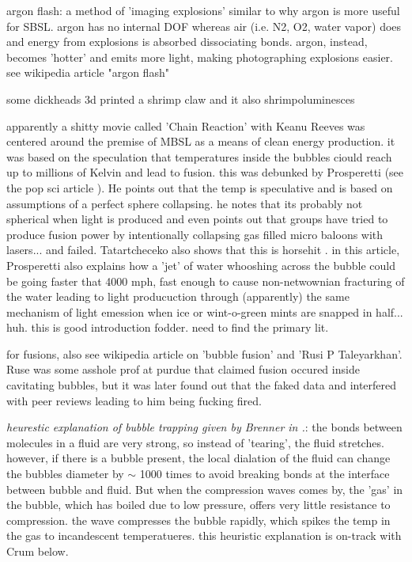 \documentclass[rmp,aps,nofootinbib,superscriptaddress,floatfix]{revtex4-2}
\begin{document}
argon flash: a method of 'imaging explosions' similar to why argon is more useful for SBSL. argon has no internal DOF whereas air (i.e. N2, O2, water vapor) does and energy from explosions is absorbed dissociating bonds. argon, instead, becomes 'hotter' and emits more light, making photographing explosions easier. see wikipedia article "argon flash"



some dickheads 3d printed a shrimp claw and it also shrimpoluminesces \cite{tang2019bioinspired}

apparently a shitty movie called 'Chain Reaction' with Keanu Reeves was centered around the premise of MBSL as a means of clean energy production. it was based on the speculation that temperatures inside the bubbles ciould reach up to millions of Kelvin and lead to fusion. this was debunked by Prosperetti (see the pop sci article \cite{chainreaction}). He points out that the temp is speculative and is based on assumptions of a perfect sphere collapsing. he notes that its probably not spherical when light is produced and even points out that groups have tried to produce fusion power by intentionally collapsing gas filled micro baloons with lasers... and failed. Tatartcheceko also shows that this is horsehit \cite{tatartchenko2017sonoluminescence}. in this article, Prosperetti also explains how a 'jet' of water whooshing across the bubble could be going faster that 4000 mph, fast enough to cause non-netwownian fracturing of the water leading to light producuction through (apparently) the same mechanism of light emession when ice or wint-o-green mints are snapped in half... huh. this is good introduction fodder. need to find the primary lit. 

for fusions, also see wikipedia article on 'bubble fusion' and 'Rusi P Taleyarkhan'. Ruse was some asshole prof at purdue that claimed fusion occured inside cavitating bubbles, but it was later found out that the faked data and interfered with peer reviews leading to him being fucking fired.

\emph{heurestic explanation of bubble trapping given by Brenner in \cite{chainreaction}.}: the bonds between molecules in a fluid are very strong, so instead of 'tearing', the fluid stretches. however, if there is a bubble present, the local dialation of the fluid can change the bubbles diameter by $\sim$ 1000 times to avoid breaking bonds at the interface between bubble and fluid. But when the compression waves comes by, the 'gas' in the bubble, which has boiled due to low pressure, offers very little resistance to compression. the wave compresses the bubble rapidly, which spikes the temp in the gas to incandescent temperatueres. this heuristic explanation is on-track with Crum \cite{crum1994sonoluminescence} below.
\end{document}
